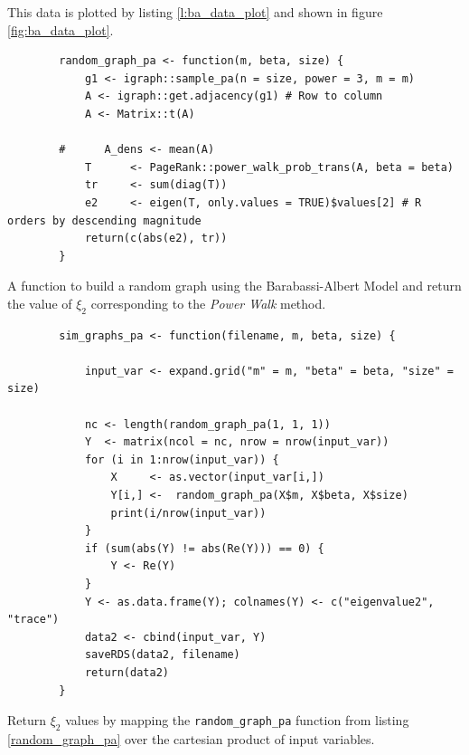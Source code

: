 \documentclass[11pt]{report}
\begin{document}
This data is plotted by listing \ref{l:ba_data_plot} and shown in figure \ref{fig:ba_data_plot}.

\begin{listing}[htbp]
    \begin{tcolorbox}
        \begin{verbatim}
        random_graph_pa <- function(m, beta, size) {
            g1 <- igraph::sample_pa(n = size, power = 3, m = m)
            A <- igraph::get.adjacency(g1) # Row to column
            A <- Matrix::t(A)

        #      A_dens <- mean(A)
            T      <- PageRank::power_walk_prob_trans(A, beta = beta)
            tr     <- sum(diag(T))
            e2     <- eigen(T, only.values = TRUE)$values[2] # R orders by descending magnitude
            return(c(abs(e2), tr))
        }
        \end{verbatim}
    \end{tcolorbox}
\caption{\label{random_graph_pa}A function to build a random graph using the Barabassi-Albert Model and return the value of \(\xi_{2}\) corresponding to the \emph{Power Walk} method.}
\end{listing}

\begin{listing}[htbp]
    \begin{tcolorbox}
        \begin{verbatim}
        sim_graphs_pa <- function(filename, m, beta, size) {

            input_var <- expand.grid("m" = m, "beta" = beta, "size" = size)

            nc <- length(random_graph_pa(1, 1, 1))
            Y  <- matrix(ncol = nc, nrow = nrow(input_var))
            for (i in 1:nrow(input_var)) {
                X     <- as.vector(input_var[i,])
                Y[i,] <-  random_graph_pa(X$m, X$beta, X$size)
                print(i/nrow(input_var))
            }
            if (sum(abs(Y) != abs(Re(Y))) == 0) {
                Y <- Re(Y)
            }
            Y <- as.data.frame(Y); colnames(Y) <- c("eigenvalue2", "trace")
            data2 <- cbind(input_var, Y)
            saveRDS(data2, filename)
            return(data2)
        }
        \end{verbatim}
    \end{tcolorbox}
\caption{\label{sim_graphs_pa}Return \(\xi_{2}\) values by mapping the \texttt{random\_graph\_pa} function from listing \ref{random_graph_pa} over the cartesian product of input variables.}
\end{listing}
\end{document}
